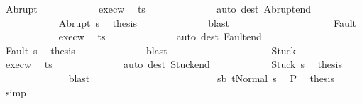 \begin{isabellebody}
\ Abrupt\isanewline
\ \ \ \ \ \ \ \ \ \ \isamarkupfalse%
\ exec{\isacharunderscore}w\ \isamarkupfalse%
\ {\isachardoublequoteopen}t{\isacharequal}s{\isacharprime}{\isachardoublequoteclose}\isanewline
\ \ \ \ \ \ \ \ \ \ \ \ \isamarkupfalse%
\ {\isacharparenleft}auto\ dest{\isacharcolon}\ Abrupt{\isacharunderscore}end{\isacharparenright}\isanewline
\ \ \ \ \ \ \ \ \ \ \isamarkupfalse%
\ Abrupt\ s{\isacharprime}\ \isamarkupfalse%
\ {\isacharquery}thesis\isanewline
\ \ \ \ \ \ \ \ \ \ \ \ \isamarkupfalse%
\ blast\isanewline
\ \ \ \ \ \ \ \ \isamarkupfalse%
\isanewline
\ \ \ \ \ \ \ \ \ \ \isamarkupfalse%
\ Fault\isanewline
\ \ \ \ \ \ \ \ \ \ \isamarkupfalse%
\ exec{\isacharunderscore}w\ \isamarkupfalse%
\ {\isachardoublequoteopen}t{\isacharequal}s{\isacharprime}{\isachardoublequoteclose}\isanewline
\ \ \ \ \ \ \ \ \ \ \ \ \isamarkupfalse%
\ {\isacharparenleft}auto\ dest{\isacharcolon}\ Fault{\isacharunderscore}end{\isacharparenright}\isanewline
\ \ \ \ \ \ \ \ \ \ \isamarkupfalse%
\ Fault\ s{\isacharprime}\ \isamarkupfalse%
\ {\isacharquery}thesis\isanewline
\ \ \ \ \ \ \ \ \ \ \ \ \isamarkupfalse%
\ blast\isanewline
\ \ \ \ \ \ \ \ \isamarkupfalse%
\isanewline
\ \ \ \ \ \ \ \ \ \ \isamarkupfalse%
\ Stuck\isanewline
\ \ \ \ \ \ \ \ \ \ \isamarkupfalse%
\ exec{\isacharunderscore}w\ \isamarkupfalse%
\ {\isachardoublequoteopen}t{\isacharequal}s{\isacharprime}{\isachardoublequoteclose}\isanewline
\ \ \ \ \ \ \ \ \ \ \ \ \isamarkupfalse%
\ {\isacharparenleft}auto\ dest{\isacharcolon}\ Stuck{\isacharunderscore}end{\isacharparenright}\isanewline
\ \ \ \ \ \ \ \ \ \ \isamarkupfalse%
\ Stuck\ s{\isacharprime}\ \isamarkupfalse%
\ {\isacharquery}thesis\isanewline
\ \ \ \ \ \ \ \ \ \ \ \ \isamarkupfalse%
\ blast\isanewline
\ \ \ \ \ \ \ \ \isamarkupfalse%
\isanewline
\ \ \ \ \ \ \isamarkupfalse%
\isanewline
\ \ \ \ \ \ \ \ \isamarkupfalse%
\ {\isachardoublequoteopen}s{\isasymnotin}b{\isachardoublequoteclose}\ {\isachardoublequoteopen}t{\isacharequal}Normal\ s{\isachardoublequoteclose}\ \isamarkupfalse%
\ P\ \isamarkupfalse%
\ {\isacharquery}thesis\ \isamarkupfalse%
\ simp\isanewline
\ \ \ \ \ \ \isamarkupfalse%

\end{isabellebody}
